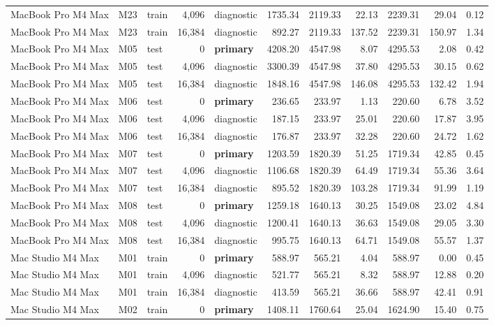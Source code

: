 \documentclass[10pt]{article}
\begin{document}
\begin{landscape}
\begin{longtable}{@{}l l l r l r r r r r r@{}}
MacBook Pro M4 Max & M23 & train & 4,096 & diagnostic & 1735.34 & 2119.33 & 22.13 & 2239.31 & 29.04 & 0.12 \\
MacBook Pro M4 Max & M23 & train & 16,384 & diagnostic & 892.27 & 2119.33 & 137.52 & 2239.31 & 150.97 & 1.34 \\
MacBook Pro M4 Max & M05 & test & 0 & \textbf{primary} & 4208.20 & 4547.98 & 8.07 & 4295.53 & 2.08 & 0.42 \\
MacBook Pro M4 Max & M05 & test & 4,096 & diagnostic & 3300.39 & 4547.98 & 37.80 & 4295.53 & 30.15 & 0.62 \\
MacBook Pro M4 Max & M05 & test & 16,384 & diagnostic & 1848.16 & 4547.98 & 146.08 & 4295.53 & 132.42 & 1.94 \\
MacBook Pro M4 Max & M06 & test & 0 & \textbf{primary} & 236.65 & 233.97 & 1.13 & 220.60 & 6.78 & 3.52 \\
MacBook Pro M4 Max & M06 & test & 4,096 & diagnostic & 187.15 & 233.97 & 25.01 & 220.60 & 17.87 & 3.95 \\
MacBook Pro M4 Max & M06 & test & 16,384 & diagnostic & 176.87 & 233.97 & 32.28 & 220.60 & 24.72 & 1.62 \\
MacBook Pro M4 Max & M07 & test & 0 & \textbf{primary} & 1203.59 & 1820.39 & 51.25 & 1719.34 & 42.85 & 0.45 \\
MacBook Pro M4 Max & M07 & test & 4,096 & diagnostic & 1106.68 & 1820.39 & 64.49 & 1719.34 & 55.36 & 3.64 \\
MacBook Pro M4 Max & M07 & test & 16,384 & diagnostic & 895.52 & 1820.39 & 103.28 & 1719.34 & 91.99 & 1.19 \\
MacBook Pro M4 Max & M08 & test & 0 & \textbf{primary} & 1259.18 & 1640.13 & 30.25 & 1549.08 & 23.02 & 4.84 \\
MacBook Pro M4 Max & M08 & test & 4,096 & diagnostic & 1200.41 & 1640.13 & 36.63 & 1549.08 & 29.05 & 3.30 \\
MacBook Pro M4 Max & M08 & test & 16,384 & diagnostic & 995.75 & 1640.13 & 64.71 & 1549.08 & 55.57 & 1.37 \\
Mac Studio M4 Max & M01 & train & 0 & \textbf{primary} & 588.97 & 565.21 & 4.04 & 588.97 & 0.00 & 0.45 \\
Mac Studio M4 Max & M01 & train & 4,096 & diagnostic & 521.77 & 565.21 & 8.32 & 588.97 & 12.88 & 0.20 \\
Mac Studio M4 Max & M01 & train & 16,384 & diagnostic & 413.59 & 565.21 & 36.66 & 588.97 & 42.41 & 0.91 \\
Mac Studio M4 Max & M02 & train & 0 & \textbf{primary} & 1408.11 & 1760.64 & 25.04 & 1624.90 & 15.40 & 0.75 \\

\end{longtable}
\end{landscape}
\end{document}
